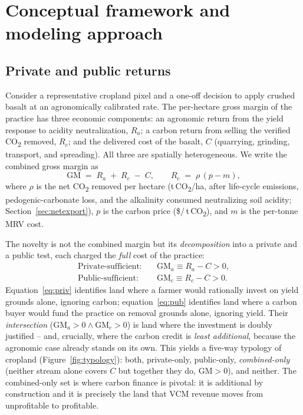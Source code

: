 \documentclass[12pt]{article}
\newcommand{\tco}{\,t\,CO\textsubscript{2}}
\newcommand{\co}{CO\textsubscript{2}}
\begin{document}
\section{Conceptual framework and modeling approach}\label{sec:methods}
\subsection{Private and public returns}\label{sec:concept}
Consider a representative cropland pixel and a one-off decision to apply crushed
basalt at an agronomically calibrated rate. The per-hectare gross margin of the
practice has three economic components: an agronomic return from the yield
response to acidity neutralization, $R_a$; a carbon return from selling the
verified \co{} removed, $R_c$; and the delivered cost of the basalt, $C$
(quarrying, grinding, transport, and spreading). All three are spatially
heterogeneous. We write the combined gross margin as
\begin{equation}
  \mathrm{GM} \;=\; R_a \;+\; R_c \;-\; C,
  \qquad R_c \;=\; \rho \,(p - m),
  \label{eq:gm}
\end{equation}
where $\rho$ is the net \co{} removed per hectare (t\,CO\textsubscript{2}/ha,
after life-cycle emissions, pedogenic-carbonate loss, and the alkalinity
consumed neutralizing soil acidity; Section~\ref{sec:netexport}), $p$ is the carbon
price (\$/\tco{}), and $m$ is the per-tonne MRV cost.

The novelty is not the combined margin but its \emph{decomposition} into a
private and a public test, each charged the \emph{full} cost of the practice:
\begin{align}
  \text{Private-sufficient:}\quad & \mathrm{GM}_a \equiv R_a - C > 0, \label{eq:priv}\\
  \text{Public-sufficient:}\quad  & \mathrm{GM}_c \equiv R_c - C > 0. \label{eq:pub}
\end{align}
Equation~\eqref{eq:priv} identifies land where a farmer would rationally invest
on yield grounds alone, ignoring carbon; equation~\eqref{eq:pub} identifies land
where a carbon buyer would fund the practice on removal grounds alone, ignoring
yield. Their \emph{intersection} ($\mathrm{GM}_a>0 \wedge \mathrm{GM}_c>0$) is
land where the investment is doubly justified -- and, crucially, where the carbon
credit is \emph{least additional}, because the agronomic case already stands on
its own. This yields a five-way typology of cropland
(Figure~\ref{fig:typology}): both, private-only, public-only,
\emph{combined-only} (neither stream alone covers $C$ but together they do,
$\mathrm{GM}>0$), and neither. The combined-only set is where carbon finance is
pivotal: it is additional by construction and it is precisely the land that VCM
revenue moves from unprofitable to profitable.
\end{document}
